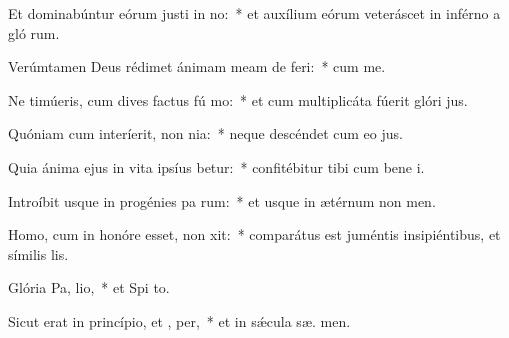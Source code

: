 \item Et dominabúntur eórum justi in no:~* et auxílium eórum veteráscet in inférno a gló rum.
\item Verúmtamen Deus rédimet ánimam meam de  feri:~* cum  me.
\item Ne timúeris, cum dives factus fú mo:~* et cum multiplicáta fúerit glóri  jus.
\item Quóniam cum interíerit, non  nia:~* neque descéndet cum eo  jus.
\item Quia ánima ejus in vita ipsíus betur:~* confitébitur tibi cum bene i.
\item Introíbit usque in progénies pa rum:~* et usque in ætérnum non  men.
\item Homo, cum in honóre esset, non xit:~* comparátus est juméntis insipiéntibus, et símilis   lis.
\item Glória Pa,  lio,~* et Spi to.
\item Sicut erat in princípio, et ,  per,~* et in sǽcula sæ. men.
